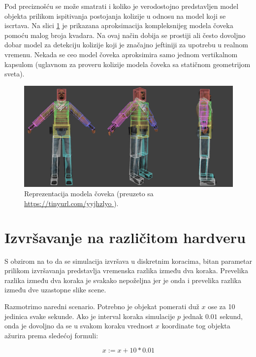 \documentclass[12pt,oneside]{memoir}
\begin{document}
Pod preciznošću se može smatrati i koliko je verodostojno predstavljen model objekta prilikom ispitivanja postojanja kolizije u odnosu 
na model koji se iscrtava.
Na slici \ref{fig:hitbox} je prikazana aproksimacija kompleksnijeg modela čoveka pomoću malog broja kvadara.
Na ovaj način dobija se prostiji ali često dovoljno dobar model za detekciju kolizije koji je značajno 
jeftiniji za upotrebu u realnom vremenu. 
Nekada se ceo model čoveka aproksimira samo jednom vertikalnom kapsulom
(uglavnom za proveru kolizije modela čoveka sa statičnom geometrijom sveta). 

\begin{figure}[h!]
	\centering
	\includegraphics[scale=0.55]{hitbox.png}
	\caption{Reprezentacija modela čoveka (\tiny preuzeto sa \url{ https://tinyurl.com/yyjhzlyo }).}
	
	\label{fig:hitbox}
\end{figure}

\section{Izvršavanje na različitom hardveru}

S obzirom na to da se simulacija izvršava u diskretnim koracima,
bitan parametar prilikom izvršavanja predstavlja vremenska razlika između dva koraka.
Prevelika razlika između dva koraka je svakako nepoželjna jer je onda i prevelika razlika između dve uzastopne slike scene.

Razmotrimo naredni scenario. Potrebno je objekat pomerati duž $x$ ose za 10 jedinica svake sekunde.
Ako je interval koraka simulacije 
$p$ jednak $0.01$ sekund, onda je dovoljno da se u svakom koraku vrednost $x$ koordinate tog objekta ažurira prema sledećoj formuli:


\begin{equation}
	x:= x + 10 * 0.01
	\label{eq:prx}
\end{equation}
\end{document}
